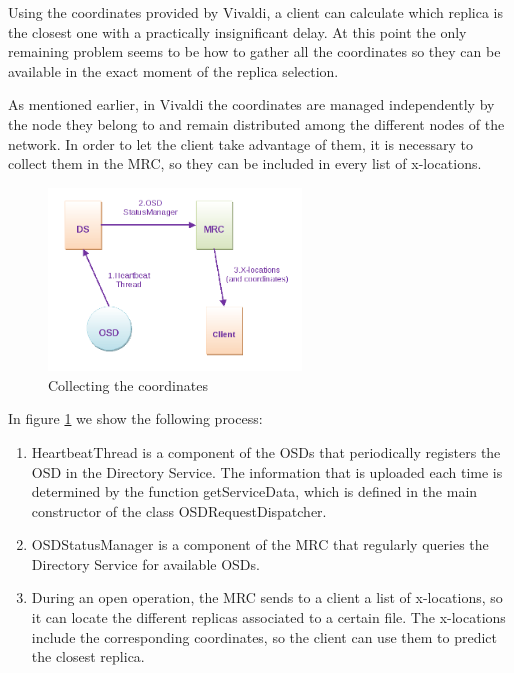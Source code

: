 Using the coordinates provided by Vivaldi, a client can calculate which replica
is the closest one with a practically insignificant delay. At this point the
only remaining problem seems to be how to gather all the coordinates so they can
be available in the exact moment of the replica selection.

As mentioned earlier, in Vivaldi the coordinates are managed
independently by the node they belong to and remain distributed among the
different nodes of the network. In order to let the client take advantage of
them, it is necessary to collect them in the MRC, so they can be included in
every list of x-locations.

\begin{figure}[t]
\begin{center}
\includegraphics[width=0.60\textwidth]{images/rms2.png}
\caption{Collecting the coordinates}
\label{rms2}
\end{center}
\end{figure}

In figure \ref{rms2} we show the following process:

\begin{enumerate}
\item HeartbeatThread is a component of the OSDs that periodically registers the
OSD in the Directory Service. The information that is uploaded each time is
determined by the function getServiceData, which is defined in the main
constructor of the class OSDRequestDispatcher.
\item OSDStatusManager is a component of the MRC that regularly queries the
Directory Service for available OSDs.
\item During an open operation, the MRC sends to a client a list of x-locations,
so it can locate the different replicas associated to a certain file. The
x-locations include the corresponding coordinates, so the client can use them to
predict the closest replica.
\end{enumerate}


